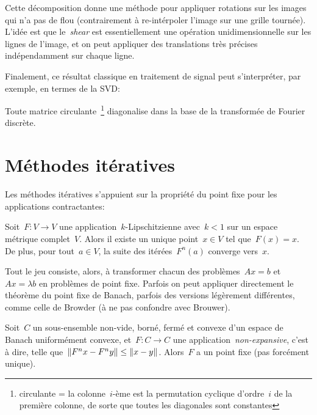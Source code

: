 Cette décomposition donne une méthode pour appliquer rotations sur les images
qui n'a pas de flou (contrairement à re-intérpoler l'image sur une grille
tournée).  L'idée est que le~\emph{shear} est essentiellement une opération
unidimensionnelle sur les lignes de l'image, et on peut appliquer des
translations très précises indépendamment sur chaque ligne.

\bigskip

Finalement, ce résultat classique en traitement de signal peut s'interpréter,
par exemple, en termes de la SVD:

\begin{proposition}
	Toute matrice circulante~\footnote{circulante = la colonne~$i$-ème est la
	permutation cyclique d'ordre~$i$ de la première colonne, de sorte que
toutes les diagonales sont constantes} diagonalise dans la base de la
transformée de Fourier discrète.
\end{proposition}

\clearpage
\section{Méthodes itératives}

Les méthodes itératives s'appuient sur la propriété du point fixe pour
les applications contractantes:

\begin{proposition}
	Soit~$F:V\to V$ une application~$k$-Lipschitzienne avec~$k<1$ sur un espace
	métrique complet~$V$.  Alors il existe un unique point~$x\in V$ tel
	que~$F(x)=x$.  De plus, pour tout~$a\in V$, la suite des itérées~$F^n(a)$
	converge vers~$x$.
\end{proposition}

Tout le jeu consiste, alors, à transformer chacun des problèmes~$Ax=b$
et~$Ax=\lambda b$ en problèmes de point fixe.  Parfois on peut appliquer
directement le théorème du point fixe de Banach, parfois des versions
légèrement différentes, comme celle de Browder (à ne pas confondre avec
Brouwer).


\begin{proposition}
	Soit~$C$ un sous-ensemble non-vide, borné, fermé et convexe d'un espace de
	Banach uniformément convexe, et~$F:C\to C$ une
	application~\emph{non-expansive}, c'est à dire,
	telle que~$\left\|F^nx-F^ny\right\|\le \left\|x-y\right\|$.  Alors~$F$ a un point fixe (pas
	forcément unique).  %
\end{proposition}

